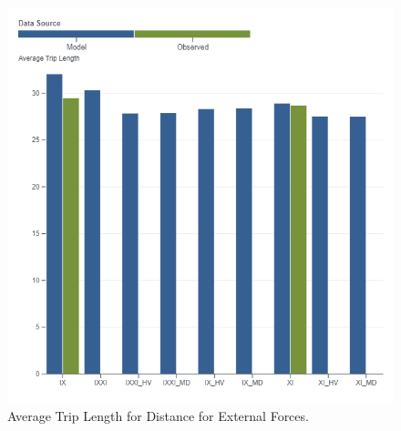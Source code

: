 \documentclass[
  letterpaper,
  DIV=11,
  numbers=noendperiod]{scrreprt}
\begin{document}
\begin{figure}[H]

{\centering \includegraphics[width=\textwidth,height=0.4\textheight]{v9x/v900/validation/_pictures/5-plot5.png}

}

\caption{\label{fig-pdf-dist-ext}Average Trip Length for Distance for
External Forces.}

\end{figure}
\end{document}
